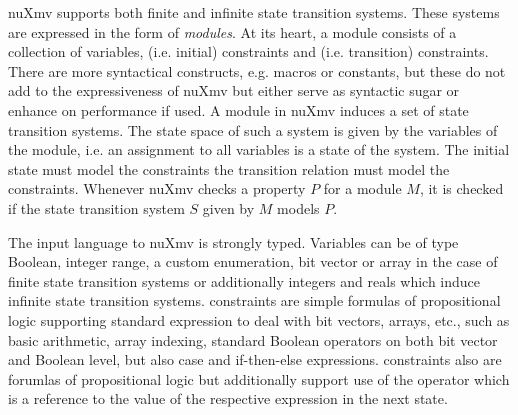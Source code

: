 nuXmv supports both finite and infinite state transition systems.
These systems are expressed in the form of \textit{modules}.
At its heart, a module consists of a collection of variables,  (i.e. initial) constraints and  (i.e. transition) constraints.
There are more syntactical constructs, e.g. macros or constants, but these do not add to the expressiveness of nuXmv but either serve as syntactic sugar or enhance on performance if used.
A module in nuXmv induces a set of state transition systems.
The state space of such a system is given by the variables of the module, i.e. an assignment to all variables is a state of the system.
The initial state must model the  constraints the transition relation must model the  constraints.
Whenever nuXmv checks a property $ P $ for a module $ M $, it is checked if the state transition system $ S $ given by $ M $ models $ P $.

The input language to nuXmv is strongly typed.
Variables can be of type Boolean, integer range, a custom enumeration, bit vector or array in the case of finite state transition systems or additionally integers and reals which induce infinite state transition systems.
 constraints are simple formulas of propositional logic supporting standard expression to deal with bit vectors, arrays, etc., such as basic arithmetic, array indexing, standard Boolean operators on both bit vector and Boolean level, but also case and if-then-else expressions.
 constraints also are forumlas of propositional logic but additionally support use of the  operator which is a reference to the value of the respective expression in the next state.

